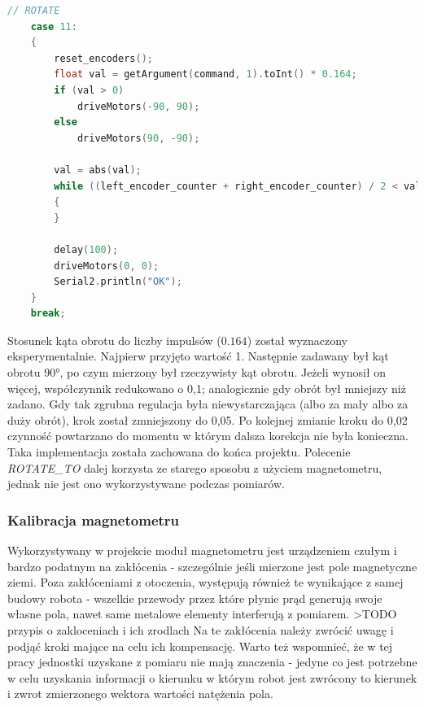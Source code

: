 \begin{lstlisting}[basicstyle=\footnotesize\ttfamily,language=c++,caption=Nowa implementacja obsługi polecenia \emph{ROTATE},label=lst:rotate]
// ROTATE
    case 11:
    {
        reset_encoders();
        float val = getArgument(command, 1).toInt() * 0.164;
        if (val > 0)
            driveMotors(-90, 90);
        else
            driveMotors(90, -90);

        val = abs(val);
        while ((left_encoder_counter + right_encoder_counter) / 2 < val)
        {
        }

        delay(100);
        driveMotors(0, 0);
        Serial2.println("OK");
    }
    break;
\end{lstlisting}

Stosunek kąta obrotu do liczby impulsów ($0.164$) został wyznaczony eksperymentalnie. Najpierw przyjęto wartość 1. Następnie zadawany był kąt obrotu 90°, po czym mierzony był rzeczywisty kąt obrotu. Jeżeli wynosił on więcej, współczynnik redukowano o 0,1; analogicznie gdy obrót był mniejszy niż zadano. Gdy tak zgrubna regulacja była niewystarczająca (albo za mały albo za duży obrót), krok został zmniejszony do 0,05. Po kolejnej zmianie kroku do 0,02 czynność powtarzano do momentu w którym dalsza korekcja nie była konieczna. \\

Taka implementacja została zachowana do końca projektu. Polecenie \emph{ROTATE\_TO} dalej korzysta ze starego sposobu z użyciem magnetometru, jednak nie jest ono wykorzystywane podczas pomiarów.

\subsubsection{Kalibracja magnetometru}
Wykorzystywany w projekcie moduł magnetometru jest urządzeniem czułym i bardzo podatnym na zakłócenia - szczególnie jeśli mierzone jest pole magnetyczne ziemi. Poza zakłóceniami z otoczenia, występują również te wynikające z samej budowy robota - wszelkie przewody przez które płynie prąd generują swoje własne pola, nawet same metalowe elementy interferują z pomiarem. >TODO przypis o zakloceniach i ich zrodlach Na te zakłócenia należy zwrócić uwagę i podjąć kroki mające na celu ich kompensację. Warto też wspomnieć, że w tej pracy jednostki uzyskane z pomiaru nie mają znaczenia - jedyne co jest potrzebne w celu uzyskania informacji o kierunku w którym robot jest zwrócony to kierunek i zwrot zmierzonego wektora wartości natężenia pola.

